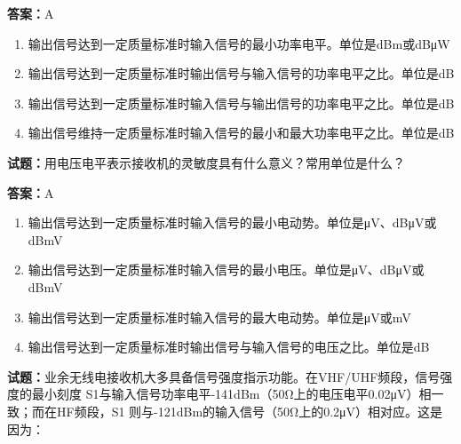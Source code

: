 \documentclass{ctexbook}
\begin{document}
\textbf{答案：}A 

\begin{enumerate}[leftmargin=3em]
  \item 输出信号达到一定质量标准时输入信号的最小功率电平。单位是dBm或dBμW 

  \item 输出信号达到一定质量标准时输出信号与输入信号的功率电平之比。单位是dB 


  \item 输出信号达到一定质量标准时输入信号与输出信号的功率电平之比。单位是dB 

  \item 输出信号维持一定质量标准时输入信号的最小和最大功率电平之比。单位是dB 

\end{enumerate}





\vspace{1em}

\textbf{试题：}用电压电平表示接收机的灵敏度具有什么意义？常用单位是什么？ 

\textbf{答案：}A 

\begin{enumerate}[leftmargin=3em]
  \item 输出信号达到一定质量标准时输入信号的最小电动势。单位是μV、dBμV或dBmV 

  \item 输出信号达到一定质量标准时输入信号的最小电压。单位是μV、dBμV或dBmV 

  \item 输出信号达到一定质量标准时输入信号的最大电动势。单位是μV或mV 

  \item 输出信号达到一定质量标准时输出信号与输入信号的电压之比。单位是dB 

\end{enumerate}





\vspace{1em}

\textbf{试题：}业余无线电接收机大多具备信号强度指示功能。在VHF/UHF频段，信号强度的最小刻度
S1与输入信号功率电平-141dBm（50Ω上的电压电平0.02μV）相一致；而在HF频段，S1
则与-121dBm的输入信号（50Ω上的0.2μV）相对应。这是因为： 
\end{document}
